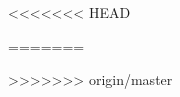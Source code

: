 \documentclass[a4paper,12pt]{article}
\begin{document}
    


\newpage
\tableofcontents
\listoffigures
\listoftables

\newpage


<<<<<<< HEAD
%
%
%
%
%
%
\newpage

%
%
%
%
%
=======
\newpage


\newpage


\newpage


\newpage


\newpage


\newpage


>>>>>>> origin/master
\newpage



\newpage
\nocite{*}



\newpage
\appendix
\end{document}
